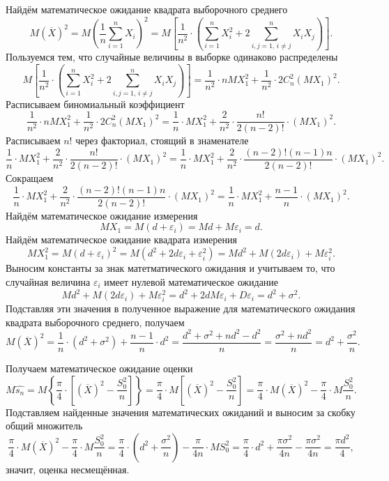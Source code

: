 Найдём математическое ожидание квадрата выборочного среднего
$$M \left( \overline{X} \right)^2 =
  M \left( \frac{1}{n} \sum \limits_{i = 1}^n X_i \right)^2 =
  M \left[
    \frac{1}{n^2} \cdot
    \left( \sum \limits_{i = 1}^n X_i^2 + 2 \sum \limits_{i, j = 1, \, i \neq j}^n X_i X_j \right)
  \right].$$
Пользуемся тем, что случайные величины в выборке одинаково распределены
$$M \left[
    \frac{1}{n^2} \cdot
    \left( \sum \limits_{i = 1}^n X_i^2 + 2 \sum \limits_{i, j = 1, \, i \neq j}^n X_i X_j \right)
  \right] =
  \frac{1}{n^2} \cdot nMX_1^2 + \frac{1}{n^2} \cdot 2C_n^2 \left( MX_1 \right)^2.$$
Расписываем биномиальный коэффициент
$$ \frac{1}{n^2} \cdot nMX_1^2 + \frac{1}{n^2} \cdot 2C_n^2 \left( MX_1 \right)^2 =
  \frac{1}{n} \cdot MX_1^2 +
  \frac{2}{n^2} \cdot \frac{n!}{2 \left( n - 2 \right)!} \cdot \left( MX_1 \right)^2.$$
Расписываем $n!$ через факториал, стоящий в знаменателе
$$ \frac{1}{n} \cdot MX_1^2 +
  \frac{2}{n^2} \cdot \frac{n!}{2 \left( n - 2 \right)!} \cdot \left( MX_1 \right)^2 =
  \frac{1}{n} \cdot MX_1^2 +
  \frac{2}{n^2} \cdot
  \frac{ \left( n - 2 \right)! \left( n - 1 \right) n}{2 \left( n - 2 \right)!} \cdot
  \left( MX_1 \right)^2.$$
Сокращаем
$$ \frac{1}{n} \cdot MX_1^2 +
  \frac{2}{n^2} \cdot
  \frac{ \left( n - 2 \right)! \left( n - 1 \right) n}{2 \left( n - 2 \right)!} \cdot
  \left( MX_1 \right)^2 =
  \frac{1}{n} \cdot MX_1^2 + \frac{n - 1}{n} \cdot \left( MX_1 \right)^2.$$
Найдём математическое ожидание измерения
$$MX_1 =
  M \left( d + \varepsilon_i \right) =
  Md + M \varepsilon_i =
  d.$$
Найдём математическое ожидание квадрата измерения
$$MX_1^2 =
  M \left( d + \varepsilon_i \right)^2 =
  M \left( d^2 + 2d \varepsilon_i + \varepsilon_i^2 \right) =
  Md^2 + M \left( 2d \varepsilon_i \right) + M \varepsilon_i^2.$$
Выносим константы за знак матетматического ожидания и учитываем то,
что случайная величина $ \varepsilon_i$ имеет нулевой математическое ожидание
$$Md^2 + M \left( 2d \varepsilon_i \right) + M \varepsilon_i^2 =
  d^2 + 2dM \varepsilon_i + D \varepsilon_i =
  d^2 + \sigma^2.$$
Подставляя эти значения
в полученное выражение для математического ожидания квадрата выборочного среднего, получаем
$$M \left( \overline{X} \right)^2 =
  \frac{1}{n} \cdot \left( d^2 + \sigma^2 \right) + \frac{n - 1}{n} \cdot d^2 =
  \frac{d^2 + \sigma^2 + nd^2 - d^2}{n} =
  \frac{ \sigma^2 + nd^2}{n} =
  d^2 + \frac{ \sigma^2}{n}.$$

Получаем математическое ожидание оценки
$$M \hat{s_n} =
  M \left\{
    \frac{ \pi }{4} \cdot \left[ \left( \overline{X} \right)^2 - \frac{S_0^2}{n} \right]
  \right\} =
  \frac{ \pi }{4} \cdot M \left[ \left( \overline{X} \right)^2 - \frac{S_0^2}{n} \right] =
  \frac{ \pi }{4} \cdot M \left( \overline{X} \right)^2 - \frac{ \pi }{4} \cdot M \frac{S_0^2}{n}.$$
Подставляем найденные значения математических ожиданий и выносим за скобку общий множитель
$$ \frac{ \pi }{4} \cdot M \left( \overline{X} \right)^2 - \frac{ \pi }{4} \cdot M \frac{S_0^2}{n} =
  \frac{ \pi }{4} \cdot \left( d^2 + \frac{ \sigma^2}{n} \right) - \frac{ \pi }{4n} \cdot MS_0^2 =
  \frac{ \pi }{4} \cdot d^2 + \frac{ \pi \sigma^2}{4n} - \frac{ \pi \sigma^2}{4n} =
  \frac{ \pi d^2}{4},$$
значит, оценка несмещённая.

